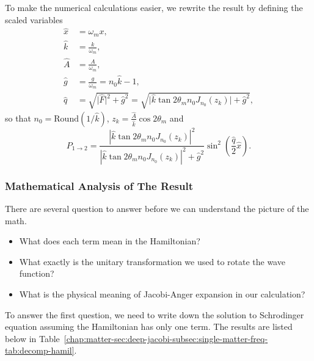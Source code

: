 To make the numerical calculations easier, we rewrite the result by defining the scaled variables
\begin{align}
   \hat x & = \omega_m x,\\
   \hat k &= \frac{k}{\omega_m}, \\
   \hat A & = \frac{A}{\omega_m}, \\
   \hat g & = \frac{g}{\omega_m} = n_0 \hat k - 1,\\
   \hat q &= \sqrt{ \lvert \hat F \rvert^2 + \hat g^2 } = \sqrt{ \lvert \hat k \tan 2\theta_m n_0 J_{n_0} (z_k) \rvert + \hat g^2 },
\end{align}
so that $n_0 = \mathrm{Round}\left( 1/\hat k\right)$, $z_k=\frac{\hat A}{\hat k} \cos 2 \theta_m$ and
\begin{equation}
   P_{1\to 2} = \frac{\left\lvert \hat k \tan 2\theta_m n_0 J_{n_0} (z_k) \right\rvert^2}{\left\lvert  \hat k \tan 2\theta_m n_0 J_{n_0} (z_k) \right\rvert^2 + \hat g ^2}\sin^2\left( \frac{ \hat q }{2} \hat x \right) .
   \label{chap:matter-sec:deep-jacobi-subsec:single-matter-freq-eqn:stimulated-single-freq-trans-probability}
\end{equation}



\subsubsection{Mathematical Analysis of The Result}


There are several question to answer before we can understand the picture of the math.
\begin{itemize}
    \item What does each term mean in the Hamiltonian?
\item What exactly is the unitary transformation we used to rotate the wave function?
\item What is the physical meaning of Jacobi-Anger expansion in our calculation?
\end{itemize}

To answer the first question, we need to write down the solution to Schrodinger equation assuming the Hamiltonian has only one term. The results are listed below in Table~\ref{chap:matter-sec:deep-jacobi-subsec:single-matter-freq-tab:decomp-hamil}.

